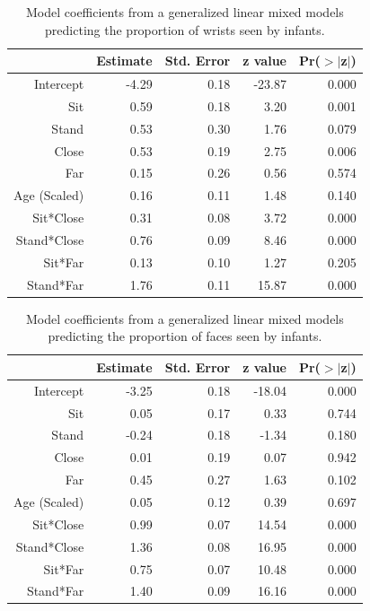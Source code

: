\documentclass[english,man]{apa6}
\begin{document}
\begin{table}[ht]
\centering
\begin{tabular}{rrrrr}
  \hline
 & Estimate & Std. Error & z value & Pr($>$$|$z$|$) \\ 
  \hline
Intercept & -4.29 & 0.18 & -23.87 & 0.000 \\ 
  Sit & 0.59 & 0.18 & 3.20 & 0.001 \\ 
  Stand & 0.53 & 0.30 & 1.76 & 0.079 \\ 
  Close & 0.53 & 0.19 & 2.75 & 0.006 \\ 
  Far & 0.15 & 0.26 & 0.56 & 0.574 \\ 
  Age (Scaled) & 0.16 & 0.11 & 1.48 & 0.140 \\ 
  Sit*Close & 0.31 & 0.08 & 3.72 & 0.000 \\ 
  Stand*Close & 0.76 & 0.09 & 8.46 & 0.000 \\ 
  Sit*Far & 0.13 & 0.10 & 1.27 & 0.205 \\ 
  Stand*Far & 1.76 & 0.11 & 15.87 & 0.000 \\ 
   \hline
\end{tabular}
\caption{Model coefficients from a generalized linear mixed models predicting the proportion of wrists seen by infants.} 
\end{table}

\begin{table}[ht]
\centering
\begin{tabular}{rrrrr}
  \hline
 & Estimate & Std. Error & z value & Pr($>$$|$z$|$) \\ 
  \hline
Intercept & -3.25 & 0.18 & -18.04 & 0.000 \\ 
  Sit & 0.05 & 0.17 & 0.33 & 0.744 \\ 
  Stand & -0.24 & 0.18 & -1.34 & 0.180 \\ 
  Close & 0.01 & 0.19 & 0.07 & 0.942 \\ 
  Far & 0.45 & 0.27 & 1.63 & 0.102 \\ 
  Age (Scaled) & 0.05 & 0.12 & 0.39 & 0.697 \\ 
  Sit*Close & 0.99 & 0.07 & 14.54 & 0.000 \\ 
  Stand*Close & 1.36 & 0.08 & 16.95 & 0.000 \\ 
  Sit*Far & 0.75 & 0.07 & 10.48 & 0.000 \\ 
  Stand*Far & 1.40 & 0.09 & 16.16 & 0.000 \\ 
   \hline
\end{tabular}
\caption{Model coefficients from a generalized linear mixed models predicting the proportion of faces seen by infants.} 
\end{table}
\end{document}
